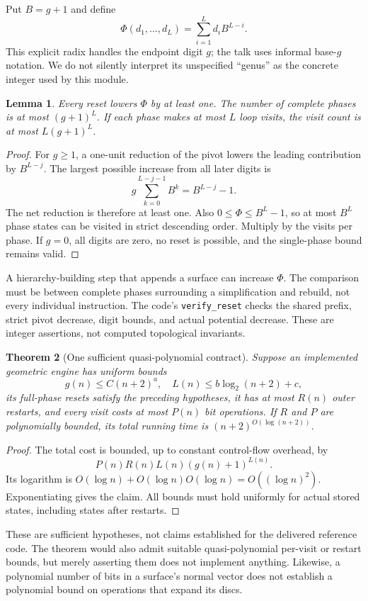 \documentclass[11pt]{article}
\newtheorem{theorem}{Theorem}[section]
\newtheorem{lemma}[theorem]{Lemma}
\theoremstyle{remark}\newtheorem{remark}[theorem]{Remark}
\newcommand{\code}[1]{\texttt{#1}}
\begin{document}
Put $B=g+1$ and define
\[
 \Phi(d_1,\ldots,d_L)=\sum_{i=1}^L d_iB^{L-i}.
\]
This explicit radix handles the endpoint digit $g$; the talk uses informal
base-$g$ notation. We do not silently interpret its unspecified ``genus'' as
the concrete integer used by this module.

\begin{lemma}
Every reset lowers $\Phi$ by at least one. The number of complete phases is at
most $(g+1)^L$. If each phase makes at most $L$ loop visits, the visit count is
at most $L(g+1)^L$.
\end{lemma}
\begin{proof}
For $g\geq1$, a one-unit reduction of the pivot lowers the leading contribution
by $B^{L-j}$. The largest possible increase from all later digits is
\[
 g\sum_{k=0}^{L-j-1}B^k=B^{L-j}-1.
\]
The net reduction is therefore at least one. Also
$0\leq\Phi\leq B^L-1$, so at most $B^L$ phase states can be visited in strict
descending order. Multiply by the visits per phase. If $g=0$, all digits are
zero, no reset is possible, and the single-phase bound remains valid.
\end{proof}

A hierarchy-building step that appends a surface can increase $\Phi$. The
comparison must be between complete phases surrounding a simplification and
rebuild, not every individual instruction. The code's \code{verify\_reset}
checks the shared prefix, strict pivot decrease, digit bounds, and actual
potential decrease. These are integer assertions, not computed topological
invariants.

\begin{theorem}[One sufficient quasi-polynomial contract]
Suppose an implemented geometric engine has uniform bounds
\[
 g(n)\leq C(n+2)^a,\quad L(n)\leq b\log_2(n+2)+c,
\]
its full-phase resets satisfy the preceding hypotheses, it has at most
$R(n)$ outer restarts, and every visit costs at most $P(n)$ bit operations.
If $R$ and $P$ are polynomially bounded, its total running time is
$(n+2)^{O(\log(n+2))}$.
\end{theorem}
\begin{proof}
The total cost is bounded, up to constant control-flow overhead, by
\[
 P(n)R(n)L(n)(g(n)+1)^{L(n)}.
\]
Its logarithm is $O(\log n)+O(\log n)O(\log n)=O((\log n)^2)$.
Exponentiating gives the claim. All bounds must hold uniformly for actual
stored states, including states after restarts.
\end{proof}

These are sufficient hypotheses, not claims established for the delivered
reference code. The theorem would also admit suitable quasi-polynomial
per-visit or restart bounds, but merely asserting them does not implement
anything. Likewise, a polynomial number of bits in a surface's normal vector
does not establish a polynomial bound on operations that expand its discs.
\end{document}
